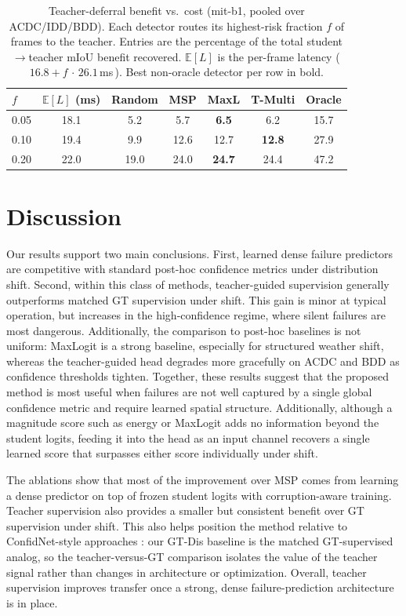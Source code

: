 \documentclass{article}
\newcommand{\win}[1]{\textcolor{wingreen}{\textbf{#1}}}
\begin{document}
\begin{table}[H]
\centering
\small
\setlength{\tabcolsep}{6pt}
\caption{Teacher-deferral benefit vs.\ cost (mit-b1, pooled over ACDC/IDD/BDD). Each detector routes its highest-risk fraction $f$ of frames to the teacher. Entries are the percentage of the total student$\to$teacher mIoU benefit recovered. $\mathbb{E}[L]$ is the per-frame latency (\,$16.8 + f\,{\cdot}\,26.1$\,ms\,). Best non-oracle detector per row in bold.}
\label{tab:defer}
\begin{tabular}{lcccccc}
\toprule
$f$ & $\mathbb{E}[L]$ (ms) & Random & MSP & MaxL & \textbf{T-Multi} & Oracle \\
\midrule
0.05 & 18.1 & 5.2 & 5.7 & \win{6.5} & 6.2 & 15.7 \\
0.10 & 19.4 & 9.9 & 12.6 & 12.7 & \win{12.8} & 27.9 \\
0.20 & 22.0 & 19.0 & 24.0 & \win{24.7} & 24.4 & 47.2 \\
\bottomrule
\end{tabular}
\end{table}


\section{Discussion}


Our results support two main conclusions. First, learned dense failure predictors are competitive with standard post-hoc confidence metrics under distribution shift. Second, within this class of methods, teacher-guided supervision generally outperforms matched GT supervision under shift. This gain is minor at typical operation, but increases in the high-confidence regime, where silent failures are most dangerous. Additionally, the comparison to post-hoc baselines is not uniform: MaxLogit is a strong baseline, especially for structured weather shift, whereas the teacher-guided head degrades more gracefully on ACDC and BDD as confidence thresholds tighten. Together, these results suggest that the proposed method is most useful when failures are not well captured by a single global confidence metric and require learned spatial structure. Additionally, although a magnitude score such as energy or MaxLogit adds no information beyond the student logits, feeding it into the head as an input channel recovers a single learned score that surpasses either score individually under shift.


The ablations show that most of the improvement over MSP comes from learning a dense predictor on top of frozen student logits with corruption-aware training. Teacher supervision also provides a smaller but consistent benefit over GT supervision under shift. This also helps position the method relative to ConfidNet-style approaches \cite{corbiere2019confidnet}: our GT-Dis baseline is the matched GT-supervised analog, so the teacher-versus-GT comparison isolates the value of the teacher signal rather than changes in architecture or optimization. Overall, teacher supervision improves transfer once a strong, dense failure-prediction architecture is in place.
\end{document}
